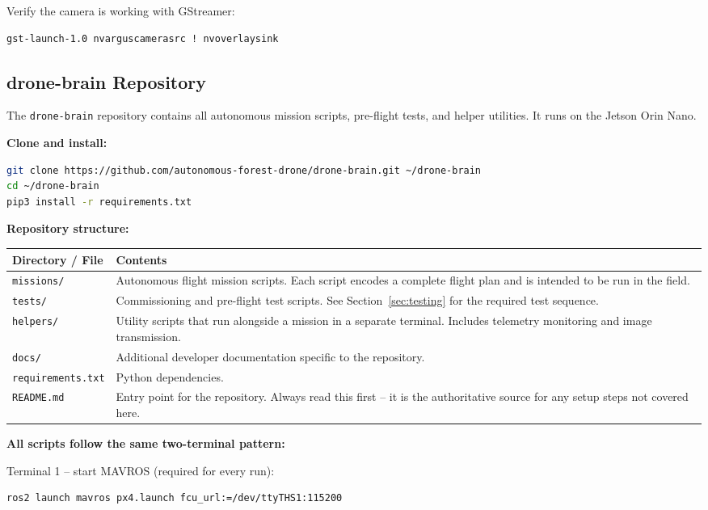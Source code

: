 \documentclass{article}
\begin{document}
Verify the camera is working with GStreamer:

\begin{lstlisting}[language=bash]
gst-launch-1.0 nvarguscamerasrc ! nvoverlaysink
\end{lstlisting}

\subsection{drone-brain Repository}
\label{sec:dronebrainrepo}

The \texttt{drone-brain} repository contains all autonomous mission scripts, pre-flight tests, and helper utilities. It runs on the Jetson Orin Nano.

\textbf{Clone and install:}

\begin{lstlisting}[language=bash]
git clone https://github.com/autonomous-forest-drone/drone-brain.git ~/drone-brain
cd ~/drone-brain
pip3 install -r requirements.txt
\end{lstlisting}

\textbf{Repository structure:}

\begin{tabular}{p{3.5cm}p{10cm}}
\toprule
\textbf{Directory / File} & \textbf{Contents} \\
\midrule
\texttt{missions/} & Autonomous flight mission scripts. Each script encodes a complete flight plan and is intended to be run in the field. \\
\texttt{tests/} & Commissioning and pre-flight test scripts. See Section~\ref{sec:testing} for the required test sequence. \\
\texttt{helpers/} & Utility scripts that run alongside a mission in a separate terminal. Includes telemetry monitoring and image transmission. \\
\texttt{docs/} & Additional developer documentation specific to the repository. \\
\texttt{requirements.txt} & Python dependencies. \\
\texttt{README.md} & Entry point for the repository. Always read this first -- it is the authoritative source for any setup steps not covered here. \\
\bottomrule
\end{tabular}

\textbf{All scripts follow the same two-terminal pattern:}

Terminal 1 -- start MAVROS (required for every run):
\begin{lstlisting}[language=bash]
ros2 launch mavros px4.launch fcu_url:=/dev/ttyTHS1:115200
\end{lstlisting}
\end{document}
